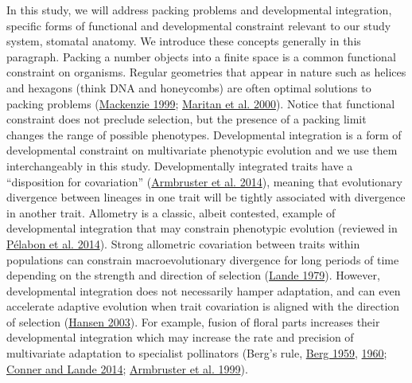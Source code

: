 \documentclass[
  12pt,
]{article}
\begin{document}
In this study, we will address packing problems and developmental integration, specific forms of functional and developmental constraint relevant to our study system, stomatal anatomy. We introduce these concepts generally in this paragraph. Packing a number objects into a finite space is a common functional constraint on organisms. Regular geometries that appear in nature such as helices and hexagons (think DNA and honeycombs) are often optimal solutions to packing problems (\protect\hyperlink{ref-mackenzie_proving_1999}{Mackenzie 1999}; \protect\hyperlink{ref-maritan_optimal_2000}{Maritan et al. 2000}). Notice that functional constraint does not preclude selection, but the presence of a packing limit changes the range of possible phenotypes. Developmental integration is a form of developmental constraint on multivariate phenotypic evolution and we use them interchangeably in this study. Developmentally integrated traits have a ``disposition for covariation'' (\protect\hyperlink{ref-armbruster_integrated_2014}{Armbruster et al. 2014}), meaning that evolutionary divergence between lineages in one trait will be tightly associated with divergence in another trait. Allometry is a classic, albeit contested, example of developmental integration that may constrain phenotypic evolution (reviewed in \protect\hyperlink{ref-pelabon_evolution_2014}{Pélabon et al. 2014}). Strong allometric covariation between traits within populations can constrain macroevolutionary divergence for long periods of time depending on the strength and direction of selection (\protect\hyperlink{ref-lande_quantitative_1979}{Lande 1979}). However, developmental integration does not necessarily hamper adaptation, and can even accelerate adaptive evolution when trait covariation is aligned with the direction of selection (\protect\hyperlink{ref-hansen_is_2003}{Hansen 2003}). For example, fusion of floral parts increases their developmental integration which may increase the rate and precision of multivariate adaptation to specialist pollinators (Berg's rule, \protect\hyperlink{ref-berg_general_1959}{Berg 1959}, \protect\hyperlink{ref-berg_ecological_1960}{1960}; \protect\hyperlink{ref-conner_raissa_2014}{Conner and Lande 2014}; \protect\hyperlink{ref-armbruster_covariance_1999}{Armbruster et al. 1999}).
\end{document}

